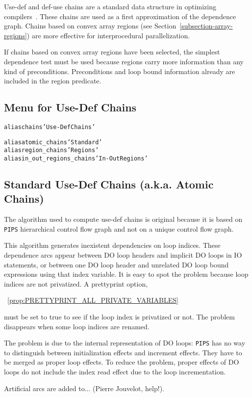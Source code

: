 \documentclass[a4paper]{report}
\newenvironment{PipsMake}{\begin{alltt}}{\end{alltt}}
\newcommand{\PipsPropRef}[1]{\texttt{\detokenize{#1}}~\ref{prop:#1}}
\newenvironment{PipsPass}[1]{\label{pass:#1}}{}
\newcommand{\Pips}{\texttt{PIPS}}
\begin{document}
\begin{PipsPass}{chains}
Use-def and def-use chains are a standard data structure in optimizing
compilers~\cite{ASU86}. These chains are used as a first approximation of
the dependence graph. Chains based on convex array regions (see
Section~\ref{subsection-array-regions}) are more effective for
interprocedural parallelization.

If chains based on convex array regions have been selected, the simplest dependence
test must be used because regions carry more information than any kind
of preconditions. Preconditions and loop bound information already are
included in the region predicate.
\end{PipsPass}

\subsection{Menu for Use-Def Chains}

\begin{PipsMake}
alias chains 'Use-Def Chains'

alias atomic_chains 'Standard'
alias region_chains 'Regions'
alias in_out_regions_chains 'In-Out Regions'
\end{PipsMake}

\subsection{Standard Use-Def Chains (a.k.a. Atomic Chains)}
\label{subsubsection-atomic-chains}

\begin{PipsPass}{atomic_chains}
The algorithm used to compute use-def chains is original because it is
based on \Pips{} hierarchical control flow graph and not on a unique
control flow graph.

This algorithm generates inexistent dependencies on loop indices. These
dependence arcs appear between DO loop headers and implicit DO loops in
IO statements, or between one DO loop header and unrelated DO loop bound
expressions using that index variable. It is easy to spot the problem
because loop indices are not privatized. A prettyprint option,
\begin{center}
\PipsPropRef{PRETTYPRINT_ALL_PRIVATE_VARIABLES}
\end{center}
must be set to true to see if the loop index is privatized or
not. The problem disappears when some loop indices are renamed.

The problem is due to the internal representation of DO loops: \Pips{} has
no way to distinguish between initialization effects and increment
effects. They have to be merged as proper loop effects. To reduce the
problem, proper effects of DO loops do not include the index read effect
due to the loop incrementation.

Artificial arcs are added to... (Pierre Jouvelot, help!).
\end{PipsPass}
\end{document}
